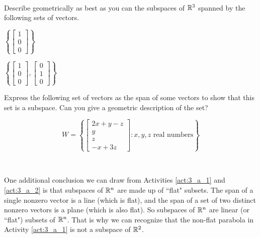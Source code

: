 \begin{activity} \label{act:3_a_2} ~
\ba 
\item Describe geometrically as best as you can the subspaces of $\mathbb{R}^3$ spanned by the following sets of vectors. 

$\left\{\left[ \begin{array}{c} 1 \\ 0 \\0\end{array} \right]\right\}$



$\left\{\left[ \begin{array}{c} 1 \\ 0\\0 \end{array} \right], \left[ \begin{array}{r} 0 \\ 1\\0 \end{array} \right]\right\}$ 



\item Express the following set of vectors as the span of some vectors to show that this set is a subspace. Can you give a geometric description of the set?

\[ W = \left\{ \left[ \begin{array}{c} 2x+y-z \\ y \\ z \\ -x+3z \end{array} \right]: x, y, z \text{ real numbers} \right \} \]


\ea
\
\end{activity}



One additional conclusion we can draw from Activities \ref{act:3_a_1} and \ref{act:3_a_2} is that subspaces of $\mathbb{R}^n$ are made up of ``flat" subsets. The span of a single nonzero vector is a line (which is flat), and the span of a set of two distinct nonzero vectors is a plane (which is also flat). So subspaces of $\mathbb{R}^n$ are linear (or ``flat") subsets of $\mathbb{R}^n$. That is why we can recognize that the non-flat parabola in Activity \ref{act:3_a_1} is not a subspace of $\mathbb{R}^2$. 
 


\label{sec:rn_exam}

\ExampleIntro


